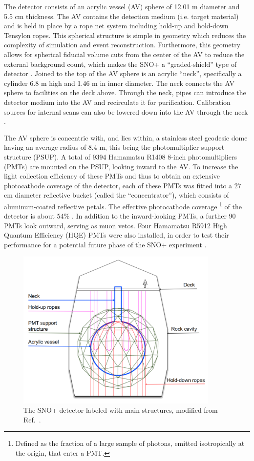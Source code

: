 The detector consists of an acrylic vessel (AV) sphere of 12.01 m diameter and 5.5 cm thickness. The AV contains the detection medium (i.e. target material) and is held in place by a rope net system including hold-up and hold-down Tensylon ropes. This spherical structure is simple in geometry which reduces the complexity of simulation and event reconstruction. Furthermore, this geometry allows for spherical fiducial volume cuts from the center of the AV to reduce the external background count, which makes the SNO+ a ``graded-shield'' type of detector \cite{waterfield2017optical}. Joined to the top of the AV sphere is an acrylic ``neck'', specifically a cylinder 6.8 m high and 1.46 m in inner diameter. The neck connects the AV sphere to facilities on the deck above. Through the neck, pipes can introduce the detector medium into the AV and recirculate it for purification. Calibration sources for internal scans can also be lowered down into the AV through the neck \cite{dragowsky200216n}.

The AV sphere is concentric with, and lies within, a stainless steel geodesic dome having an average radius of 8.4 m, this being the photomultiplier support structure (PSUP). A total of 9394 Hamamatsu R1408 8-inch photomultipliers (PMTs) are mounted on the PSUP, looking inward to the AV. To increase the light collection efficiency of these PMTs and thus to obtain an extensive photocathode coverage of the detector, each of these PMTs was fitted into a 27 cm diameter reflective bucket (called the ``concentrator''), which consists of aluminum-coated reflective petals. The effective photocathode coverage \footnote{Defined as the fraction of a large sample of photons, emitted isotropically at the origin, that enter a PMT.} of the detector is about 54\% \cite{whitepaper}. In addition to the inward-looking PMTs, a further 90 PMTs look outward, serving as muon vetos. Four Hamamatsu R5912 High Quantum Efficiency (HQE) PMTs were also installed, in order to test their performance for a potential future phase of the SNO+ experiment \cite{stringer2019sensitivity}.

\begin{figure}[htbp]
	\centering
	\includegraphics[width=10cm]{SNOPdetector.png}
	\caption[The SNO+ detector labeled with main structures.]{The SNO+ detector labeled with main structures, modified from Ref.~\cite{jones2011background}.}
	\label{snopdetector}
\end{figure}

